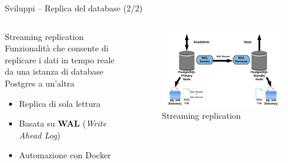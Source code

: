 \begin{frame}{Sviluppi – Replica del database (2/2)}

\begin{columns}

\begin{column}{0.45\textwidth}
\begin{block}{Streaming replication}
Funzionalità che consente di replicare i dati in tempo reale da una istanza di database Postgres a un’altra

\begin{itemize}
  \item Replica di sola lettura
  \item Basata su \textbf{WAL} (\textit{Write Ahead Log})
  \item Automazione con Docker\vspace{0.1cm}
\end{itemize}
\end{block}
\end{column}

\begin{column}{0.55\textwidth}
\begin{figure}[H]
\centering
\captionsetup{justification=centering}
\includegraphics[width=\textwidth]{images/streaming_replication}
\caption{Streaming replication}
\end{figure}
\end{column}

\end{columns}

\end{frame}


